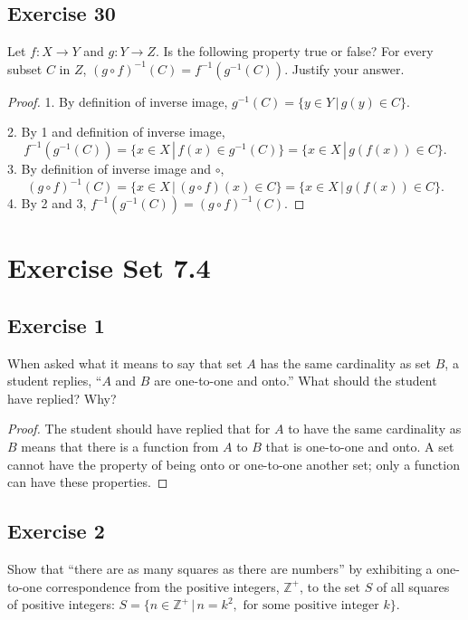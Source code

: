 \documentclass[14pt]{extarticle}
\newcommand{\Z}{\mathbb{Z}}
\begin{document}
\subsection{Exercise 30}
Let \(f: X \to Y\) and \(g: Y \to Z\). Is the following property true or false? For every subset $C$ in $Z$, 
\((g \circ f)^{-1}(C) = f^{-1}(g^{-1}(C))\). Justify your answer.

\begin{proof}
1. By definition of inverse image, \(g^{-1}(C) = \{y \in Y \, | \, g(y) \in C\}\).

2. By 1 and definition of inverse image, 
\[
f^{-1}(g^{-1}(C)) = \{x \in X \, | \, f(x) \in g^{-1}(C)\} = \{x \in X \, | \, g(f(x)) \in C\}.
\]
3. By definition of inverse image and $\circ$, 
\[
(g \circ f)^{-1}(C) = \{x \in X \, | \, (g \circ f)(x) \in C\} = \{x \in X \, | \, g(f(x)) \in C\}.
\]
4. By 2 and 3, \(f^{-1}(g^{-1}(C)) = (g \circ f)^{-1}(C)\).
\end{proof}

\section{Exercise Set 7.4}

\subsection{Exercise 1}
When asked what it means to say that set $A$ has the same cardinality as set $B$, a student replies, “$A$ and $B$ are 
one-to-one and onto.” What should the student have replied? Why?

\begin{proof}
The student should have replied that for $A$ to have the same cardinality as $B$ means that there is a function from 
$A$ to $B$ that is one-to-one and onto. A set cannot have the property of being onto or one-to-one another set; only 
a function can have these properties.
\end{proof}

\subsection{Exercise 2}
Show that “there are as many squares as there are numbers” by exhibiting a one-to-one correspondence from the positive 
integers, $\Z^+$, to the set $S$ of all squares of positive integers: \(S = \{n \in \Z^+ \, | \, n = k^2, 
\text{ for some positive integer } k\}\).
\end{document}
